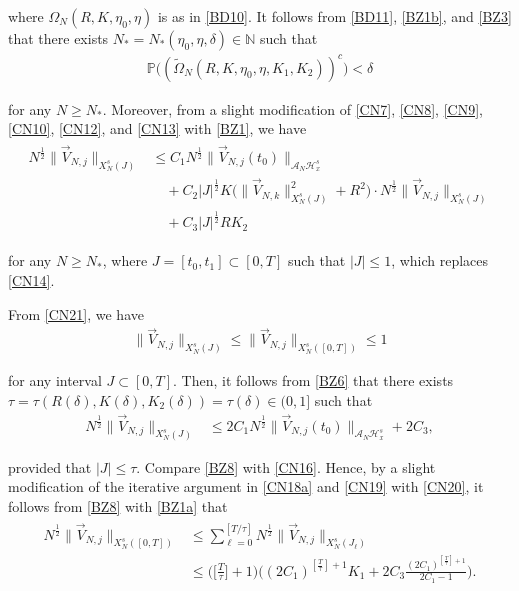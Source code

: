 \documentclass[letterpaper, 11pt,  reqno]{amsart}
\newcommand{\1}{\hspace{0.5mm}\text{I}\hspace{0.2mm}}
\newcommand{\noi}{\noindent}
\newcommand{\N}{\mathbb{N}}
\newcommand{\PP}{\mathbb{P}}
\renewcommand{\H}{\mathcal{H}}
\newcommand{\dl}{\delta}
\newcommand{\wt}{\widetilde}
\newcommand{\A}{\mathcal{A}}
\renewcommand{\O}{\Omega}
\renewcommand{\l}{\ell}
\numberwithin{equation}{section}
\numberwithin{theorem}{section}
\begin{document}
\noi
where 
$ \O_N  (R, K, \eta_0, \eta)$
is as  in 
\eqref{BD10}.
It follows from 
\eqref{BD11}, 
\eqref{BZ1b}, 
and  \eqref{BZ3}
that there exists $N_* = N_*(\eta_0, \eta, \dl) \in \N$ such that 
\begin{align}
\PP\big((\wt \O_N  (R, K, \eta_0, \eta, K_1, K_2))^c\big) <  \dl
\label{BZ5}
\end{align}

\noi
for any $N \ge N_*$.
Moreover, 
from a slight modification of \eqref{CN7}, \eqref{CN8}, 
\eqref{CN9}, \eqref{CN10}, 
\eqref{CN12}, and \eqref{CN13} with \eqref{BZ1}, 
we have 
\begin{align}
\begin{split}
N^\frac 12 \|\vec V_{N, j}\|_{X^s_{N}(J)}
& \le 
C_1 
N^\frac 12 \|\vec  V_{N, j} (t_0) \|_{\A_N \H^s_x} \\
& \quad 
+ C_2 |J|^\frac 12 
K 
\Big( \| \vec V_{N, k}\|_{X^s_{N}(J)}^2 
+ R^2  \Big)\cdot 
N^\frac 12  \|\vec  V_{N, j}\|_{X^s_{N}(J)}\\
& \quad 
+C_3 |J|^\frac 12 R  K_2
\end{split}
\label{BZ6}
\end{align}

\noi
for any $N \ge N_*$, 
where  $J = [t_0, t_1]\subset [0, T]$
such that $ |J|\le 1$, 
which replaces
\eqref{CN14}.


From 
 \eqref{CN21}, we have 
\begin{align*}
\|\vec  V_{N, j}\|_{X^s_{N}(J)}
\le \|\vec  V_{N, j}\|_{X^s_{N}([0, T])}
\le 1
\end{align*}

\noi
for any interval $J \subset [0, T]$.
Then, 
it follows from \eqref{BZ6} that 
there exists $\tau = \tau (R(\dl), K(\dl), K_2(\dl)) = \tau(\dl)\in (0, 1]$ such that 
\begin{align}
N^\frac 12 \|\vec V_{N, j}\|_{X^s_{N}(J)}
& \le 
2 C_1 
N^\frac 12 
\|\vec  V_{N, j} (t_0) \|_{\A_N \H^s_x} 
+2 C_3 , 
\label{BZ8}
\end{align}

\noi
provided that $|J| \le \tau$.
Compare \eqref{BZ8} with \eqref{CN16}.
Hence, by a slight modification of the iterative argument in 
\eqref{CN18a}  and 
\eqref{CN19} with  \eqref{CN20}, 
it follows from  \eqref{BZ8} with \eqref{BZ1a} that 
\begin{align}
\begin{split}
N^\frac 12 \|\vec V_{N, j}\|_{X^s_N([0, T])}
& \le
\sum_{\l = 0}^{[T/\tau]} 
N^{\frac 12} \|\vec V_{N, j}\|_{X^s_{N}(J_\l )}\\
& \le 
\bigg(\Big[\frac T\tau\Big]+1\bigg)\bigg( (2C_1)^{[\frac T\tau]+1} K_1 +  
2C_3  
\frac { (2C_1)^{[\frac T\tau]+1}}{2C_1 - 1}
\bigg). 
\end{split}
\label{BZ9}
\end{align}
\end{document}
